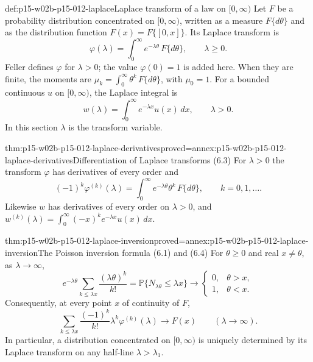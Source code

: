 \begin{hbdefinition}{def:p15-w02b-p15-012-laplace}{Laplace transform of a law on \([0,\infty)\)}
Let \(F\) be a probability distribution concentrated on \([0,\infty)\),
written as a measure \(F\{d\theta\}\) and as the distribution function
\(F(x)=F\{[0,x]\}\). Its Laplace transform is
\[
 \varphi(\lambda)=\int_0^\infty e^{-\lambda\theta}\,F\{d\theta\},
 \qquad\lambda\geq0 .
 \tag{6.2}
\]
Feller defines \(\varphi\) for \(\lambda>0\); the value \(\varphi(0)=1\) is
added here. When they are finite, the moments are
\(\mu_k=\int_0^\infty\theta^k\,F\{d\theta\}\), with \(\mu_0=1\).
For a bounded continuous \(u\) on \([0,\infty)\), the Laplace integral is
\[
 w(\lambda)=\int_0^\infty e^{-\lambda x}u(x)\,dx,\qquad\lambda>0 .
 \tag{6.5}
\]
In this section \(\lambda\) is the transform variable.
\end{hbdefinition}

\begin{hbtheorem}{thm:p15-w02b-p15-012-laplace-derivatives}{proved=annex:p15-w02b-p15-012-laplace-derivatives}{Differentiation of Laplace transforms (6.3)}
For \(\lambda>0\) the transform \(\varphi\) has derivatives of every order and
\[
 (-1)^k\varphi^{(k)}(\lambda)=\int_0^\infty e^{-\lambda\theta}\theta^k\,F\{d\theta\},
 \qquad k=0,1,\ldots .
 \tag{6.3}
\]
Likewise \(w\) has derivatives of every order on \(\lambda>0\), and
\(w^{(k)}(\lambda)=\int_0^\infty(-x)^ke^{-\lambda x}u(x)\,dx\).
\end{hbtheorem}

\begin{hbtheorem}{thm:p15-w02b-p15-012-laplace-inversion}{proved=annex:p15-w02b-p15-012-laplace-inversion}{The Poisson inversion formula (6.1) and (6.4)}
For \(\theta\geq0\) and real \(x\neq\theta\), as \(\lambda\to\infty\),
\[
 e^{-\lambda\theta}\sum_{k\leq\lambda x}\frac{(\lambda\theta)^k}{k!}
   =\mathbb P\{N_{\lambda\theta}\leq\lambda x\}
   \longrightarrow
   \begin{cases}0,&\theta>x,\\ 1,&\theta<x.\end{cases}
 \tag{6.1}
\]
Consequently, at every point \(x\) of continuity of \(F\),
\[
 \sum_{k\leq\lambda x}\frac{(-1)^k}{k!}\lambda^k\varphi^{(k)}(\lambda)
   \longrightarrow F(x)\qquad(\lambda\to\infty).
 \tag{6.4}
\]
In particular, a distribution concentrated on \([0,\infty)\) is uniquely
determined by its Laplace transform on any half-line \(\lambda>\lambda_1\).
\end{hbtheorem}

